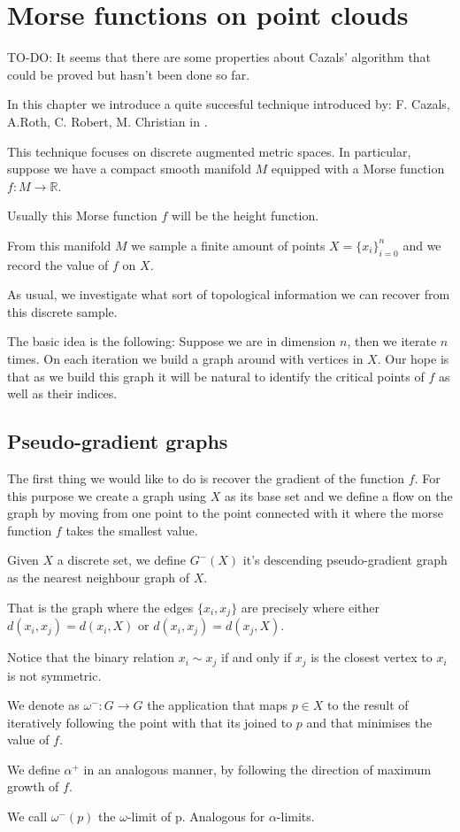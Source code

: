 \chapter{Morse functions on point clouds}

{\color{blue}

TO-DO: It seems that there are some properties about Cazals' algorithm that could be proved 
but hasn't been done so far.}

In this chapter we introduce a quite succesful technique introduced by: 
F. Cazals, A.Roth, C. Robert, M. Christian
in \cite{caz2013}.

This technique focuses on discrete augmented metric spaces.
In particular, suppose we have a compact smooth manifold
$M$ equipped with a Morse function $f:M\to \mathbb{R}$.

Usually this Morse function $f$ will be the height function.

From this manifold $M$ we sample a finite amount of points 
$X=\{x_i\}_{i=0}^n$ and we record the value of $f$ on $X$.

As usual, we investigate what sort of topological information we can recover from this
discrete sample.


The basic idea is the following: Suppose we are in dimension $n$,
then we iterate $n$ times. On each iteration we build a graph around with vertices in $X$.
Our hope is that as we build this graph it will be natural to identify the critical points of $f$ as
well as their indices.

\section{Pseudo-gradient graphs}

The first thing we would like to do is recover the gradient of the function $f$.
For this purpose we create a graph using $X$ as its base set
and we define a flow on the graph by moving from one point to the point
connected with it where the morse function $f$ takes the smallest value.

\begin{definition}
    \label{nng}

Given $X$ a discrete set,
we define $G^-(X)$ it's descending pseudo-gradient graph
as the nearest neighbour graph of $X$. 

That is the graph where the 
edges $\{x_i,x_j\}$ are precisely where either $d(x_i,x_j)=d(x_i,X)$
or $d(x_i,x_j)=d(x_j,X)$. 

Notice that the binary relation $x_i\sim x_j$ if 
and only if
$x_j$ is the closest vertex to $x_i$ is not symmetric.

We denote as $\omega^-:G\to G$ the application that
maps $p\in X$ to the result of iteratively following the point
with that its joined to $p$ and that minimises the value of $f$.

We define $\alpha^+$ in an analogous manner, by following the direction 
of maximum growth of $f$.

    We call $\omega^-(p)$ the $\omega$-limit of p. Analogous for $\alpha$-limits.
\end{definition}

